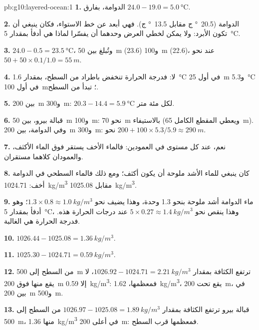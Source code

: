 \begin{solution}{pb:g10:layered-ocean:1}
\textbf{1.} الدوامة، بفارق $24.0 - 19.0 = \qty{5.0}{\degreeCelsius}$.

\textbf{2.} الدوامة (\qty{20.5}{\degree} ج مقابل \qty{13.5}{\degree} ج).
فهي أبعد عن خط الاستواء، فكان ينبغي أن تكون الأبرد: ولا يمكن لخطي العرض وحدهما
أن يفسّرا لماذا هي أدفأ بمقدار \qty{5}{\degreeCelsius}.

\textbf{3.} $24.0 - 0.5 = \qty{23.5}{\degreeCelsius}$، وتُبلغ بين
\qty{50}{m} (23.6) و\qty{100}{m} (22.6)، عند نحو $50 + 50 \times
0.1/1.0 = \qty{55}{m}$.

\textbf{4.} لا: فدرجة الحرارة تنخفض باطراد من السطح، بمقدار
\qty{1.6}{\degreeCelsius} في أول \qty{25}{m} و\qty{5.3}{\degreeCelsius}
في أول \qty{100}{m}؛  تبدأ من السطح.

\textbf{5.} بين \qty{200}{m} و\qty{300}{m}: $20.3 - 14.4 =
\qty{5.9}{\degreeCelsius}$ لكل مئة متر.

\textbf{6.} قبالة بيرو، بين \qty{50}{m} و\qty{100}{m}: نحو
\qty{70}{m} بالاستيفاء (ويعطي المقطع الكامل \qty{65}{m}). وفي
الدوامة، بين \qty{200}{m} و\qty{300}{m}: نحو $200 + 100 \times 5.3/5.9
\approx \qty{290}{m}$.

\textbf{7.} نعم، عند كل مستوى في العمودين: فالماء الأخف يستقر فوق الماء الأكثف،
والعمودان كلاهما مستقران.

\textbf{8.} كان ينبغي للماء الأشد ملوحة أن يكون أكثف؛ ومع ذلك فالماء السطحي في الدوامة
أخف: \qty{1024.71}{kg/m^3} مقابل \qty{1025.08}{kg/m^3}.

\textbf{9.} ماء الدوامة أشد ملوحة بنحو 1.3 وحدة، وهذا يضيف نحو
$1.3 \times 0.8 \approx \qty{1.0}{kg/m^3}$؛ وهو أدفأ بمقدار \qty{5}{\degreeCelsius}،
وهذا ينقص نحو $5 \times 0.27 \approx \qty{1.4}{kg/m^3}$ عند درجات الحرارة هذه.
فدرجة الحرارة هي الغالبة.

\textbf{10.} $1026.44 - 1025.08 = \qty{1.36}{kg/m^3}$.

\textbf{11.} $1025.30 - 1024.71 = \qty{0.59}{kg/m^3}$.

\textbf{12.} من السطح إلى \qty{500}{m} ترتفع الكثافة بمقدار
$1026.92 - 1024.71 = \qty{2.21}{kg/m^3}$، لا يقع منها فوق \qty{200}{m} إلا
\qty{0.59}{kg/m^3}: فمعظمها، \qty{1.62}{kg/m^3}، يقع تحت
\qty{200}{m}، في  بين \qty{200}{m} و\qty{500}{m}.

\textbf{13.} قبالة بيرو ترتفع الكثافة بمقدار $1026.97 - 1025.08 =
\qty{1.89}{kg/m^3}$ من السطح إلى \qty{500}{m}، منها
\qty{1.36}{kg/m^3} في أعلى \qty{200}{m}: فمعظمها قرب السطح.


\end{solution}

